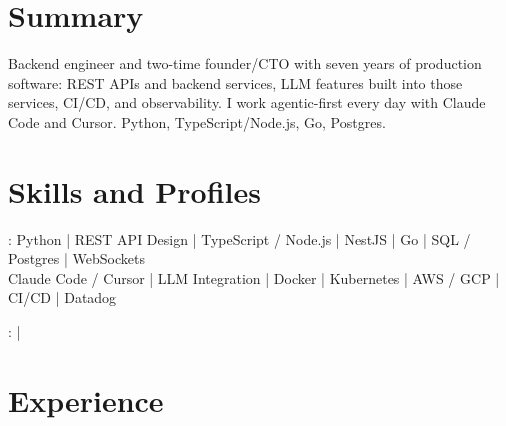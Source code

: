 \documentclass[print]{jack-resume}
\begin{document}
\pagecolor{darkmodeBackground}


\begin{minipage}[t][1cm][t]{.03\textwidth}
    \hfill
\end{minipage}

\section{Summary}
Backend engineer and two-time founder/CTO with seven years of production software: REST APIs and backend services, LLM features built into those services, CI/CD, and observability. I work agentic-first every day with Claude Code and Cursor. Python, TypeScript/Node.js, Go, Postgres.
\sectionsep

\section{Skills and Profiles}
:
Python \hfill | \hfill
REST API Design \hfill | \hfill
TypeScript / Node.js \hfill | \hfill
NestJS \hfill | \hfill
Go \hfill | \hfill
SQL / Postgres \hfill | \hfill
WebSockets \\
\hspace{1.0cm} Claude Code / Cursor \hfill | \hfill
LLM Integration \hfill | \hfill
Docker \hfill | \hfill
Kubernetes \hfill | \hfill
AWS / GCP \hfill | \hfill
CI/CD \hfill | \hfill
Datadog \\

\raggedright{
    :
      \href{https://www.linkedin.com/in/jack-sturtevant/}{ \ExternalLink} |
     \href{https://github.com/jacksturt}{ \ExternalLink}}

\section{Experience}
\end{document}
